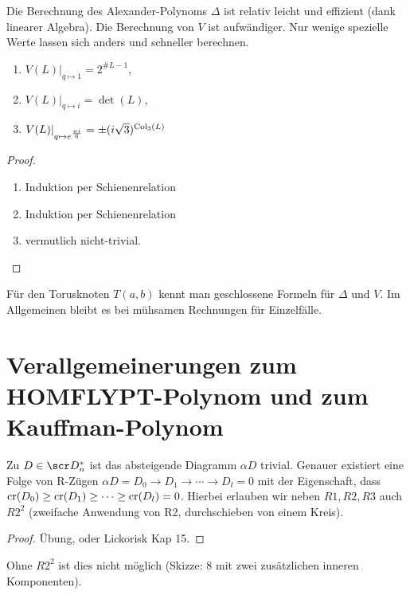 \begin{nt}
    Die Berechnung des Alexander-Polynoms $\Delta$ ist relativ leicht und effizient (dank linearer Algebra).
    Die Berechnung von $V$ ist aufwändiger.
    Nur wenige spezielle Werte lassen sich anders und schneller berechnen.
\end{nt}

\begin{prop}
    \begin{enumerate}[1)]
        \item
            $V(L)|_{q\mapsto 1} = 2^{\# L - 1}$,
        \item
            $V(L)|_{q\mapsto i} = \det(L)$,
        \item
            $V(L)|_{q\mapsto e^{\frac{\pi i}{6}}} = \pm (i\sqrt{3})^{\operatorname{Col}_3(L)}$
    \end{enumerate}
    \begin{proof}
        \begin{enumerate}[1)]
            \item
                Induktion per Schienenrelation
            \item
                Induktion per Schienenrelation
            \item
                vermutlich nicht-trivial.
        \end{enumerate}
    \end{proof}
\end{prop}

\begin{nt}
    Für den Torusknoten $T(a,b)$ kennt man geschlossene Formeln für $\Delta$ und $V$.
    Im Allgemeinen bleibt es bei mühsamen Rechnungen für Einzelfälle.
\end{nt}


\section{Verallgemeinerungen zum HOMFLYPT-Polynom und zum Kauffman-Polynom}

\begin{lem}
    Zu $D \in \scr D_n^*$ ist das absteigende Diagramm $\alpha D$ trivial.
    Genauer existiert eine Folge von R-Zügen
    \begin{math}
        \alpha D = D_0 \to D_1 \to \dotsb \to D_l = 0
    \end{math}
    mit der Eigenschaft, dass $\operatorname{cr}(D_0) \ge \operatorname{cr}(D_1) \ge \dotsb \ge \operatorname{cr}(D_l) = 0$.
    Hierbei erlauben wir neben $R1, R2, R3$ auch $R2^2$ (zweifache Anwendung von R2, durchschieben von einem Kreis).
    \begin{proof}
        Übung, oder Lickorisk Kap 15.
    \end{proof}
    \begin{note}
        Ohne $R2^2$ ist dies nicht möglich (Skizze: 8 mit zwei zusätzlichen inneren Komponenten).
    \end{note}
\end{lem}

